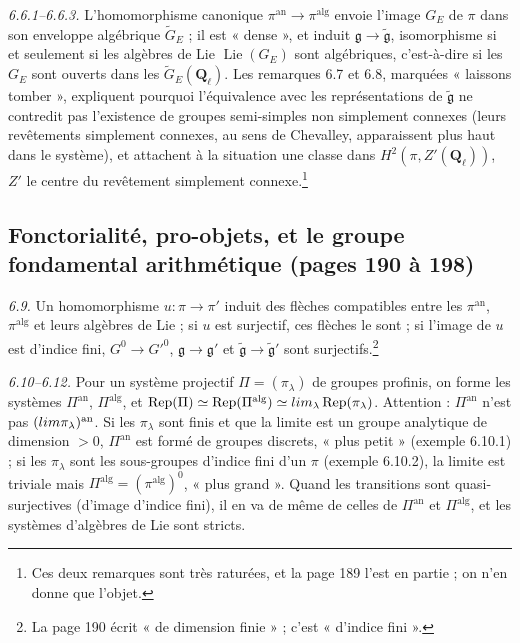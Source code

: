 \documentclass[11pt,a4paper]{article}
\begin{document}
\emph{6.6.1--6.6.3.} L'homomorphisme canonique $\pi^{\mathrm{an}} \to
\pi^{\mathrm{alg}}$ envoie l'image $G_E$ de $\pi$ dans son enveloppe algébrique
$\widetilde G_E$ ; il est « dense », et induit $\mathfrak{g} \to
\widetilde{\mathfrak{g}}$, isomorphisme si et seulement si les algèbres de Lie
$\operatorname{Lie}(G_E)$ sont algébriques, c'est-à-dire si les $G_E$ sont ouverts
dans les $\widetilde G_E(\mathbf{Q}_\ell)$. Les remarques 6.7 et 6.8, marquées
« laissons tomber », expliquent pourquoi l'équivalence avec les représentations
de $\widetilde{\mathfrak{g}}$ ne contredit pas l'existence de groupes semi-simples
non simplement connexes (leurs revêtements simplement connexes, au sens de
Chevalley, apparaissent plus haut dans le système), et attachent à la situation
une classe dans $H^2(\pi, Z'(\mathbf{Q}_\ell))$, $Z'$ le centre du revêtement
simplement connexe.\footnote{Ces deux remarques sont très raturées, et la page 189
l'est en partie ; on n'en donne que l'objet.}

\subsection*{Fonctorialité, pro-objets, et le groupe fondamental arithmétique (pages 190 à 198)}

\emph{6.9.} Un homomorphisme $u : \pi \to \pi'$ induit des flèches compatibles
entre les $\pi^{\mathrm{an}}$, $\pi^{\mathrm{alg}}$ et leurs algèbres de Lie ; si
$u$ est surjectif, ces flèches le sont ; si l'image de $u$ est d'indice fini,
$G^0 \to G'^0$, $\mathfrak{g} \to \mathfrak{g}'$ et $\widetilde{\mathfrak{g}} \to
\widetilde{\mathfrak{g}}'$ sont surjectifs.\footnote{La page 190 écrit « de
dimension finie » ; c'est « d'indice fini ».}

\emph{6.10--6.12.} Pour un système projectif $\Pi = (\pi_\lambda)$ de groupes
profinis, on forme les systèmes $\Pi^{\mathrm{an}}$, $\Pi^{\mathrm{alg}}$, et
$\operatorname{Rep}(\Pi) \simeq \operatorname{Rep}(\Pi^{\mathrm{alg}}) \simeq
\varinjlim_\lambda \operatorname{Rep}(\pi_\lambda)$. Attention : $\Pi^{\mathrm{an}}$
n'est pas $(\varprojlim \pi_\lambda)^{\mathrm{an}}$. Si les $\pi_\lambda$ sont finis
et que la limite est un groupe analytique de dimension $>0$, $\Pi^{\mathrm{an}}$
est formé de groupes discrets, « plus petit » (exemple 6.10.1) ; si les
$\pi_\lambda$ sont les sous-groupes d'indice fini d'un $\pi$ (exemple 6.10.2), la limite est triviale mais
$\Pi^{\mathrm{alg}} = (\pi^{\mathrm{alg}})^0$, « plus grand ». Quand les
transitions sont quasi-surjectives (d'image d'indice fini), il en va de même de
celles de $\Pi^{\mathrm{an}}$ et $\Pi^{\mathrm{alg}}$, et les systèmes d'algèbres
de Lie sont stricts.
\end{document}
